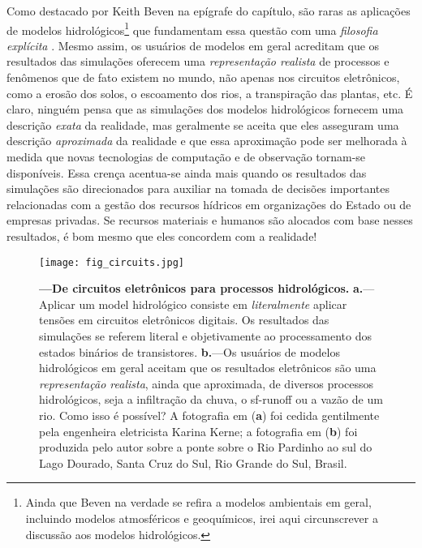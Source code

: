 \documentclass[./main.tex]{subfiles}
\begin{document}
\par Como destacado por Keith Beven na epígrafe do capítulo, são raras as aplicações de modelos hidrológicos\footnote{Ainda que Beven na verdade se refira a modelos ambientais em geral, incluindo modelos atmosféricos e geoquímicos, irei aqui circunscrever a discussão aos modelos hidrológicos.} que fundamentam essa questão com uma \textit{filosofia explícita} \cite{Beven2009}. Mesmo assim, os usuários de modelos em geral acreditam que os resultados das simulações oferecem uma \textit{representação realista} de processos e fenômenos que de fato existem no mundo, não apenas nos circuitos eletrônicos, como a erosão dos solos, o escoamento dos rios, a transpiração das plantas, etc. É claro, ninguém pensa que as simulações dos modelos hidrológicos fornecem uma descrição \textit{exata} da realidade, mas geralmente se aceita que eles asseguram uma descrição \textit{aproximada} da realidade e que essa aproximação pode ser melhorada à medida que novas tecnologias de computação e de observação tornam-se disponíveis. Essa crença acentua-se ainda mais quando os resultados das simulações são direcionados para auxiliar na tomada de decisões importantes relacionadas com a gestão dos recursos hídricos em organizações do Estado ou de empresas privadas. Se recursos materiais e humanos são alocados com base nesses resultados, é bom mesmo que eles concordem com a realidade! 

\begin{figure}[t!] %
	\centering				
	\texttt{[image: fig\_circuits.jpg]}		
	\caption[De circuitos eletrônicos para processos hidrológicos]
	{\textbf{---\;De circuitos eletrônicos para processos hidrológicos.}
        \;\textbf{a.}\;---\;Aplicar um \gls{model} hidrológico consiste em \textit{literalmente} aplicar tensões em circuitos eletrônicos digitais. Os resultados das simulações se referem literal e objetivamente ao processamento dos estados binários de transistores. \;\textbf{b.}\;---\;Os usuários de modelos hidrológicos em geral aceitam que os resultados eletrônicos são uma \textit{representação realista}, ainda que aproximada, de diversos processos hidrológicos, seja a infiltração da chuva, o \gls{sf-runoff} ou a vazão de um rio. Como isso é possível? A fotografia em (\textbf{a}) foi cedida gentilmente pela engenheira eletricista Karina Kerne; a fotografia em (\textbf{b}) foi produzida pelo autor sobre a ponte sobre o Rio Pardinho ao sul do Lago Dourado, Santa Cruz do Sul, Rio Grande do Sul, Brasil.
	}
\label{fig:circuits}  %
\end{figure}
\end{document}
